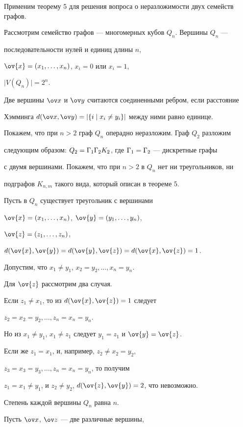 Применим теорему 5 для решения вопроса о неразложимости двух семейств графов.





\begin{exam}


Рассмотрим семейство графов --- многомерных кубов $Q_n$. Вершины $Q_n$ --- 


последовательности нулей и единиц длины $n$,


$\ov{x}=(x_1,\dotsc , x_n)$, $x_i=0$ или $x_i=1$,


$\vert{V(Q_n)}\vert=2^n$.


Две вершины $\ov x$ и $\ov y$ считаются соединенными ребром, если расстояние 


Хэмминга $d(\ov x,\ov y)=|\{ i \mid x_i\neq y_i\} |$ между ними равно единице. 


Покажем, что при $n>2$ граф $Q_n$ операдно неразложим. Граф $Q_2$ разложим 


следующим образом: $Q_2={\Gamma}_1{\Gamma}_2K_2$, где ${\Gamma}_1={\Gamma}_2$ --- дискретные графы 


с двумя вершинами. Покажем, что при $n>2$ в $Q_n$ нет ни треугольников, ни 


подграфов $K_{n, m}$ такого вида, который описан в теореме 5. 


Пусть в $Q_n$ существует треугольник с вершинами


$\ov{x}=(x_1,\dotsc , x_n)$, $\ov{y}=(y_1,\dotsc , y_n)$,


$\ov{z}=(z_1,\dotsc , z_n)$,


$d(\ov{x},\ov{y})=d(\ov{y},\ov{z})=d(\ov{x},\ov{z})=1$.


Допустим, что $x_1\ne y_1$, $x_2=y_2,\dotsc , x_n=y_n$.


Для $\ov{z}$ рассмотрим два случая.


Если $z_1\ne x_1$, то из $d(\ov{x},\ov{z})=1$ следует 


$z_2=x_2=y_2,\dotsc , z_n=x_n=y_n$.


Но из $x_1\ne y_1$, $x_1\ne z_1$ следует $y_1=z_1$ и $\ov{y}=\ov{z}$.


Если же $z_1=x_1$, и, например, $z_2\ne x_2=y_2$, 


$z_3=x_3=y_3,\dotsc , z_n=x_n=y_n$, то получим


$z_1=x_1\neq y_1$, и $z_2\ne y_2$, $d(\ov{z},\ov{y})=2$, что невозможно.


Степень каждой вершины $Q_n$ равна $n$. 


Пусть $\ov x$, $\ov z$ --- две различные вершины,



\end{exam}
